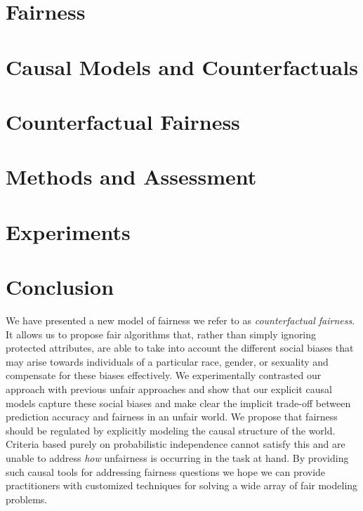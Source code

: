 \documentclass{article}
\begin{document}
\section{Fairness}
\label{sec:related}


\section{Causal Models and Counterfactuals}
\label{background}


\section{Counterfactual Fairness}
\label{sec:count_fair}



\section{Methods and Assessment}
\label{sec:methods}


\section{Experiments}
\label{sec:experiments}


\section{Conclusion}
\label{sec:conclusion}
We have presented a new model of fairness we refer to as {\em counterfactual fairness}. It allows us to propose fair
algorithms that, rather than simply ignoring protected attributes, are
able to take into account the different social biases
that may arise towards individuals of a particular race, gender, or
sexuality and compensate for these biases effectively. We
experimentally contrasted our approach with previous unfair
approaches and show that our explicit causal models capture these
social biases and make clear the implicit trade-off between
prediction accuracy and fairness in an unfair world. We propose that fairness should be regulated by explicitly modeling the causal structure of the world. Criteria based purely on probabilistic independence cannot satisfy this and are unable to address \emph{how} unfairness is occurring in the task at hand. By providing such causal tools for addressing fairness questions we hope we can provide practitioners with customized techniques for solving a wide array of fair modeling problems.



\end{document}
